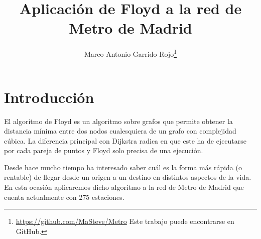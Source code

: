 \documentclass[spanish, a4paper, 12pt] {article}
\begin{document}
\title{Aplicación de Floyd a la red de Metro de Madrid}
\author{Marco Antonio Garrido Rojo\thanks{\url{https://github.com/MaSteve/Metro} Este trabajo puede encontrarse en GitHub.}}
\date{}
\maketitle
\section{Introducción}
El algoritmo de Floyd es un algoritmo sobre grafos que permite obtener la distancia mínima entre dos nodos cualesquiera de un grafo con complejidad cúbica. La diferencia principal con Dijkstra radica en que este ha de ejecutarse por cada pareja de puntos y Floyd solo precisa de una ejecución.\\ \par
Desde hace mucho tiempo ha interesado saber cuál es la forma más rápida (o rentable) de llegar desde un origen a un destino en distintos aspectos de la vida. En esta ocasión aplicaremos dicho algoritmo a la red de Metro de Madrid que cuenta actualmente con 275 estaciones.
\end{document}
